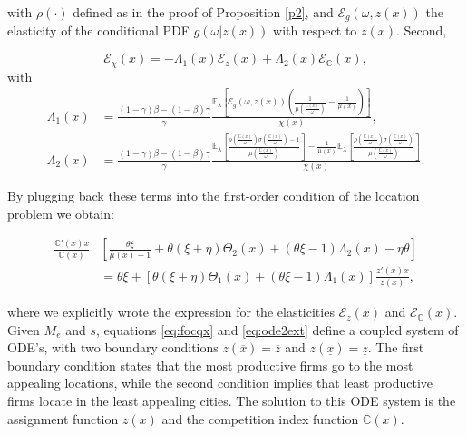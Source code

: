 with $\rho(\cdot)$  defined as in the proof of Proposition \ref{p2}, and $\mathcal{E}_g(\omega, z(x))$ the elasticity of the conditional PDF $g(\omega | z(x))$ with respect to $z(x)$. Second,

\begin{equation*}
	\mathcal{E}_{\chi}(x) = -\Lambda_1\left(x\right)\mathcal{E}_z(x) + \Lambda_2 \left(x\right)\mathcal{E}_\mathbb{C}(x), 
\end{equation*}
with 
\begin{align*}
	\Lambda_1(x) & = \frac{(1-\gamma)\beta - (1-\beta)\gamma}{\gamma} \frac{\mathbb{E}_\lambda\left[\mathcal{E}_g(\omega, z(x))\left(\frac{1}{\mu\left(\frac{\mathbb{C}(x)}{\omega}\right)} - \frac{1}{\overline{\mu}(x)}\right)\right]}{\chi(x)}, \\
      \Lambda_2(x) & = \frac{(1-\gamma)\beta - (1-\beta)\gamma}{\gamma} \frac{\mathbb{E}_\lambda \left[ \frac{\rho\left(\frac{\mathbb{C}(x)}{\omega}\right) \sigma\left(\frac{\mathbb{C}(x)}{\omega}\right) - 1}{\mu\left(\frac{\mathbb{C}(x)}{\omega}\right)} \right] - \frac{1}{\overline{\mu}(x)} \mathbb{E}_\lambda \left[ \frac{\rho\left(\frac{\mathbb{C}(x)}{\omega}\right) \sigma\left(\frac{\mathbb{C}(x)}{\omega}\right)}{\mu\left(\frac{\mathbb{C}(x)}{\omega}\right)} \right]}{\chi(x)}.
\end{align*}

By plugging back these terms into the first-order condition of the location problem we obtain:

\begin{align}
	\frac{\mathbb{C}'(x)x}{\mathbb{C}(x)} & \left[\frac{\theta\xi}{\overline{\mu}(x) -1 } + \theta(\xi + \eta)\Theta_2(x) + (\theta\xi - 1) 	\Lambda_2(x) -  \eta \theta \right] \nonumber \\
    & = \theta\xi + \left[\theta(\xi + \eta) \Theta_1(x) + (\theta\xi - 1) 	\Lambda_1(x) \right] \frac{z'(x)x}{z(x)}, \label{eq:ode2ext}
\end{align}

where we explicitly wrote the expression for the elasticities $\mathcal{E}_z(x)$ and $\mathcal{E}_\mathbb{C}(x)$. Given $M_e$ and $s$, equations \eqref{eq:focqx} and \eqref{eq:ode2ext} define a coupled system of ODE's, with two boundary conditions $z(\overline{x}) = \overline{z}$ and $z(\underline{x}) = \underline{z}$. The first boundary condition states that the most productive firms go to the most appealing locations, while the second condition implies that least productive firms locate in the least appealing cities. The solution to this ODE system is the assignment function $z(x)$ and the competition index function $\mathbb{C}(x)$.

